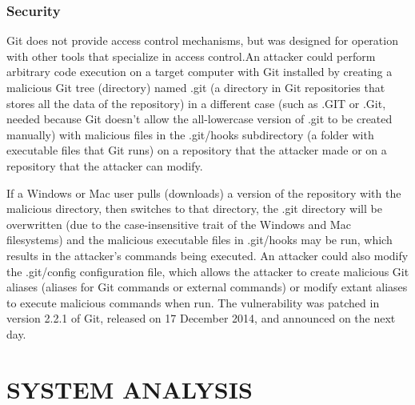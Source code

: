 \documentclass[a4paper,12pt]{article}
\begin{document}
\subsubsection{Security}\vspace{2mm}
Git does not provide access control mechanisms, but was designed for operation with other tools that specialize in access control.An attacker could perform arbitrary code execution on a target computer with Git installed by creating a malicious Git tree (directory) named .git (a directory in Git repositories that stores all the data of the repository) in a different case (such as .GIT or .Git, needed because Git doesn't allow the all-lowercase version of .git to be created manually) with malicious files in the .git/hooks subdirectory (a folder with executable files that Git runs) on a repository that the attacker made or on a repository that the attacker can modify.
\par\vspace{2mm}
 If a Windows or Mac user pulls (downloads) a version of the repository with the malicious directory, then switches to that directory, the .git directory will be overwritten (due to the case-insensitive trait of the Windows and Mac filesystems) and the malicious executable files in .git/hooks may be run, which results in the attacker's commands being executed. An attacker could also modify the .git/config configuration file, which allows the attacker to create malicious Git aliases (aliases for Git commands or external commands) or modify extant aliases to execute malicious commands when run. The vulnerability was patched in version 2.2.1 of Git, released on 17 December 2014, and announced on the next day.
\par\vspace{2mm}
\newpage
\section{SYSTEM ANALYSIS}\vspace{5mm}
\end{document}
